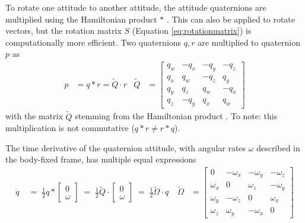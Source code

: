 To rotate one attitude to another attitude, the attitude quaternions are multiplied using the Hamiltonian product $*$ .
This can also be applied to rotate vectors, but the rotation matrix $S$ (Equation \ref{eq:rotationmatrix}) is computationally more efficient.
Two quaternions $q, r$ are multiplied to quaternion $p$ as \cite{stevens2015}
\begin{align}
    p &= q * r = \tilde Q \cdot r &
    \tilde Q &= \begin{bmatrix}
        q_w & -q_x & -q_y & -q_z \\
        q_x & q_w & -q_z & q_y \\
        q_y & q_z & q_w & -q_x \\
        q_z & -q_y & q_x & q_w
    \end{bmatrix} 
    \label{eq:quaternion-mult}
\end{align}
with the matrix $\tilde Q$ stemming from the Hamiltonian product \cite{stevens2015}.
To note: this multiplication is not commutative ($q*r \neq r*q$).

The time derivative of the quaternion attitude, with angular rates $\omega$ described in the body-fixed frame, has multiple equal expressions \cite{zipfel2007, sola2017, stevens2015}
\begin{align}
    \dot q \;
    &= \; \frac{1}{2} q * \begin{bmatrix}
        0 \\ \omega
    \end{bmatrix} \;
    = \; \frac{1}{2} \tilde Q \cdot \begin{bmatrix}
        0 \\ \omega
    \end{bmatrix} \;
    = \; \frac{1}{2} \tilde \Omega \cdot q \;
    & 
    \tilde \Omega &= \begin{bmatrix}
        0 & -\omega_x & -\omega_y & -\omega_z \\
        \omega_x & 0 & \omega_z & -\omega_y \\
        \omega_y & -\omega_z & 0 & \omega_x \\
        \omega_z & \omega_y & -\omega_x & 0
    \end{bmatrix}    
    \label{eq:quaternion-deriv}
\end{align}

